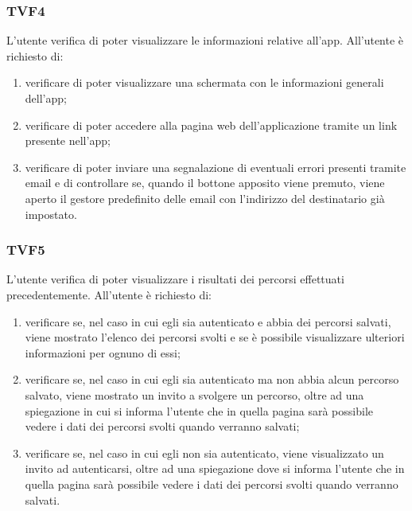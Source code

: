 		\subsubsection{TVF4}
			L'utente verifica di poter visualizzare le informazioni relative all'app.
			All'utente è richiesto di:
			\begin{enumerate}
				\item verificare di poter visualizzare una schermata con le informazioni generali dell'app;
				\item verificare di poter accedere alla pagina web dell'applicazione tramite un link presente nell'app;
				\item verificare di poter inviare una segnalazione di eventuali errori presenti tramite email e di controllare se, quando il bottone apposito viene premuto, viene aperto il gestore predefinito delle email con l'indirizzo del destinatario già impostato.
			\end{enumerate}
		\subsubsection{TVF5}
			L'utente verifica di poter visualizzare i risultati dei percorsi effettuati precedentemente.
			All'utente è richiesto di:
			\begin{enumerate}
				\item verificare se, nel caso in cui egli sia autenticato e abbia dei percorsi salvati, viene mostrato l'elenco dei percorsi svolti e se è possibile visualizzare ulteriori informazioni per ognuno di essi;
				\item verificare se, nel caso in cui egli sia autenticato ma non abbia alcun percorso salvato, viene mostrato un invito a svolgere un percorso, oltre ad una spiegazione in cui si informa l'utente che in quella pagina sarà possibile vedere i dati dei percorsi svolti quando verranno salvati;
				\item verificare se, nel caso in cui egli non sia autenticato, viene visualizzato un invito ad autenticarsi, oltre ad una spiegazione dove si informa l'utente che in quella pagina sarà possibile vedere i dati dei percorsi svolti quando verranno salvati.
			\end{enumerate}
